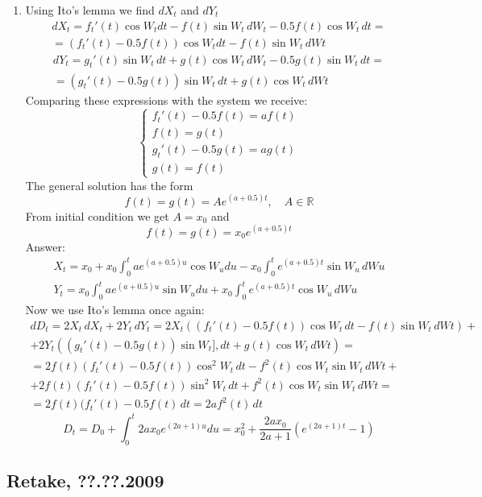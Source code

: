 \documentclass[12pt, a4paper]{article}
\newcommand{\RR}{\mathbb{R}}
\begin{document}
\begin{enumerate}
\item Using Ito's lemma  we find $dX_t$ and $dY_t$
\label{spiral_wiener}
\begin{multline*}
dX_t=f_t'(t) \cos W_t dt -f(t)\sin W_t \, dW_t-0.5f(t)\cos W_t\, dt=\\
= (f_t'(t)-0.5f(t))\cos W_tdt -f(t)\sin W_t \,dWt
\end{multline*}
\begin{multline*}
dY_t=g_t'(t) \sin W_t \, dt +g(t)\cos W_t \, dW_t-0.5g(t)\sin W_t\,dt=\\
= (g_t'(t)-0.5g(t))\sin W_t\,dt +g(t)\cos W_t \,dWt
\end{multline*}
%
Comparing these expressions with the system we receive:
\[
\begin{cases}
f_t'(t)-0.5f(t) = af(t)\\
f(t) = g(t)\\
 g_t'(t)-0.5g(t) = ag(t)\\
g(t) = f(t)
\end{cases}
\]
%
The general solution has the form
\[
f(t)=g(t)=A e^{(a+0.5)t}, \quad A\in  \RR
\]
%
From initial condition we get $A=x_0$ and
\[
f(t)=g(t)=x_0 e^{(a+0.5)t}
\]
%
Answer:
\[
\begin{array}{l}
X_t=x_0+x_0\int_0^{t} a e^{(a+0.5)u} \cos W_u du - x_0\int_0^{t} e^{(a+0.5)t}\sin W_u \,dWu\\
Y_t=x_0\int_0^{t} a e^{(a+0.5)u} \sin W_u du +x_0\int_0^{t} e^{(a+0.5)t}\cos W_u \, dWu
\end{array}
\]
%
Now we use Ito's lemma once again:
\begin{multline*}
dD_t=2X_t \, dX_t+2Y_t \, dY_t=2X_t((f_t'(t)-0.5f(t))\cos W_t \, dt -f(t)\sin W_t \,dWt)+\\
+ 2Y_t((g_t'(t)-0.5g(t))\sin W_t ], dt +g(t)\cos W_t\,dWt)=\\
=2f(t)(f_t'(t)-0.5f(t))\cos^2 W_t \, dt-f^2(t)\cos W_t\sin W_t\,dWt+\\
+2f(t)(f_t'(t)-0.5f(t))\sin^2 W_t \, dt+f^2(t)\cos W_t\sin W_t\,dWt=\\
=2f(t)(f_t'(t)-0.5f(t) \, dt=2af^2(t)\,dt
\end{multline*}
%
\[
D_t=D_0+\int_0^{t} 2a x_0 e^{(2a+1)u }du= x_0^2+\frac{2ax_0}{2a+1}(e^{(2a+1)t}-1)
\]

\end{enumerate}



\subsection{Retake, ??.??.2009}
\end{document}
